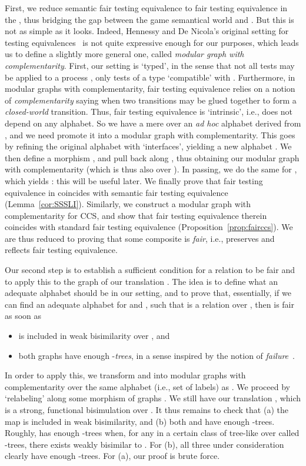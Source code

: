 \documentclass{LMCS}
\theoremstyle{plain}\newtheorem{satz}[thm]{Satz}
\begin{document}
First, we reduce semantic fair testing equivalence to fair testing
equivalence in the \lts{} , thus bridging the gap
between the game semantical world and \ltss{}. But this is not as
simple as it looks.  Indeed, Hennessy and De Nicola's original setting
for testing equivalences~\citep{DBLP:journals/tcs/NicolaH84} is not
quite expressive enough for our purposes, which leads us to define a
slightly more general one, called \emph{modular graph with
  complementarity}.  First, our setting is `typed', in the sense that
not all tests may be applied to a process , only tests of a type
`compatible' with . Furthermore, in modular graphs with
complementarity, fair testing equivalence relies on a notion of
\emph{complementarity} saying when two transitions may be glued
together to form a \emph{closed-world} transition.  Thus, fair testing
equivalence is `intrinsic', i.e., does not depend on any alphabet.  So
we have a mere \lts{}  over an \emph{ad hoc} alphabet
 derived from , and we need promote it into a modular
graph with complementarity.  This goes by refining the original
alphabet  with `interfaces', yielding a new alphabet . We
then define a morphism , and pull 
 back along , thus obtaining our modular graph with
complementarity  (which is thus also \anlts{} over
). In passing, we do the same for , which yields
: this will be useful later.  We finally prove that
fair testing equivalence in  coincides with semantic
fair testing equivalence (Lemma~\ref{cor:SSSLI}).  Similarly, we
construct a modular graph with complementarity  for CCS, and
show that fair testing equivalence therein coincides with standard
fair testing equivalence (Proposition~\ref{prop:fairccs}).  We are
thus reduced to proving that some composite  is \emph{fair}, i.e.,
preserves and reflects fair testing equivalence.

Our second step is to establish a sufficient condition for a relation
 to be fair and to apply this to the graph of our
translation .  The idea is to define what an
adequate alphabet  should be in our setting, and to prove that,
essentially, if we can find an adequate alphabet  for  and ,
such that  is a relation over , then  is fair as soon as
\begin{itemize}
\item  is included in weak bisimilarity over , and
\item both graphs have enough -\emph{trees}, in a sense
  inspired by the notion of
  \emph{failure}~\cite{DBLP:journals/iandc/RensinkV07}.
\end{itemize}
In order to apply this, we transform  and
 into modular graphs with complementarity over the same
alphabet  (i.e., set of labels) as .  We proceed by
`relabeling' along some morphism of graphs .  We
still have our translation , which is a strong, functional bisimulation over .
It thus remains to check that (a) the map  is included in weak bisimilarity, and (b) both 
and  have enough -trees.  Roughly,  has enough
-trees when, for any  in a certain class of tree-like \ltss{}
over  called -trees, there exists  weakly bisimilar
to .  For (b), all three \ltss{} under consideration clearly have
enough -trees. For (a), our proof is brute force.
\end{document}
